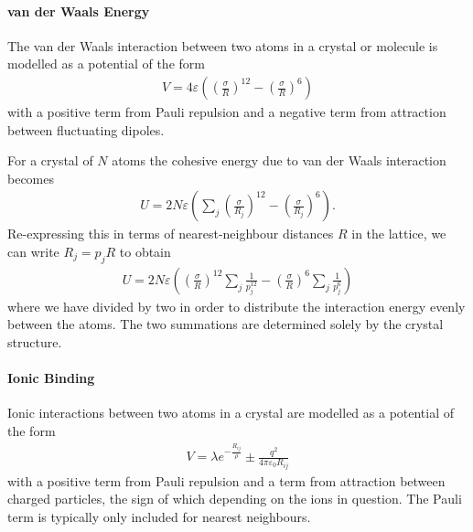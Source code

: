 \paragraph{van der Waals Energy}
The van der Waals interaction between two atoms in a crystal or molecule is modelled as a potential of the form
\begin{align*}
	V = 4\varepsilon\left(\left(\frac{\sigma}{R}\right)^{12} - \left(\frac{\sigma}{R}\right)^{6}\right)
\end{align*}
with a positive term from Pauli repulsion and a negative term from attraction between fluctuating dipoles.

For a crystal of $N$ atoms the cohesive energy due to van der Waals interaction becomes
\begin{align*}
	U = 2N\varepsilon\left(\sum\limits_{j}\left(\frac{\sigma}{R_{j}}\right)^{12} - \left(\frac{\sigma}{R_{j}}\right)^{6}\right).
\end{align*}
Re-expressing this in terms of nearest-neighbour distances $R$ in the lattice, we can write $R_{j} = p_{j}R$ to obtain
\begin{align*}
	U = 2N\varepsilon\left(\left(\frac{\sigma}{R}\right)^{12}\sum\limits_{j}\frac{1}{p_{j}^{12}} - \left(\frac{\sigma}{R}\right)^{6}\sum\limits_{j}\frac{1}{p_{j}^{6}}\right)
\end{align*}
where we have divided by two in order to distribute the interaction energy evenly between the atoms. The two summations are determined solely by the crystal structure.

\paragraph{Ionic Binding}
Ionic interactions between two atoms in a crystal are modelled as a potential of the form
\begin{align*}
	V = \lambda e^{-\frac{R_{ij}}{\rho}} \pm \frac{q^{2}}{4\pi\varepsilon_{0}R_{ij}}
\end{align*}
with a positive term from Pauli repulsion and a term from attraction between charged particles, the sign of which depending on the ions in question. The Pauli term is typically only included for nearest neighbours.

